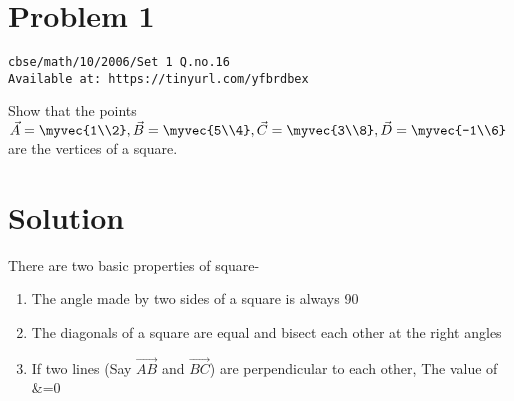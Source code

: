 \documentclass[journal,12pt,twocolumn]{IEEEtran}
\begin{document}
\section{Problem 1}
\begin{lstlisting}
cbse/math/10/2006/Set 1 Q.no.16
Available at: https://tinyurl.com/yfbrdbex
\end{lstlisting}
Show that the points $\vec {A}=\myvec {1\\2},
\vec {B}=\myvec {5\\4},
\vec {C}=\myvec {3\\8},
\vec {D}=\myvec {-1\\6}$ are the vertices of a square.
\section{Solution}
There are two basic properties of square-
\begin{lemma}
\begin{enumerate}


     \item  The angle made by two sides of a square is always 90\degree
     \item  The diagonals of a square are equal and bisect each other at the right angles
     \item  If two lines (Say {$\vec{AB}$} and {$\vec{BC}$}) are perpendicular to each   other, The value of &=0
     
\end{enumerate}
\end{lemma}
\end{document}
